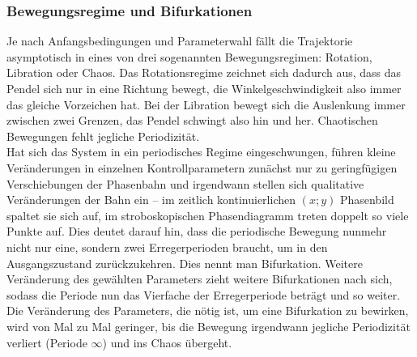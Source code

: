 \documentclass[numbers=noenddot,12pt,a4paper]{scrartcl}
\begin{document}
\subsubsection{Bewegungsregime und Bifurkationen}
Je nach Anfangsbedingungen und Parameterwahl fällt die Trajektorie asymptotisch in eines von drei sogenannten Bewegungsregimen: Rotation, Libration oder Chaos. Das Rotationsregime zeichnet sich dadurch aus, dass das Pendel sich nur in eine Richtung bewegt, die Winkelgeschwindigkeit also immer das gleiche Vorzeichen hat. Bei der Libration bewegt sich die Auslenkung immer zwischen zwei Grenzen, das Pendel schwingt also hin und her. Chaotischen Bewegungen fehlt jegliche Periodizität.\\
Hat sich das System in ein periodisches Regime eingeschwungen, führen kleine Veränderungen in einzelnen Kontrollparametern zunächst nur zu geringfügigen Verschiebungen der Phasenbahn und irgendwann stellen sich qualitative Veränderungen der Bahn ein -- im zeitlich kontinuierlichen $(x;y)$ Phasenbild spaltet sie sich auf, im stroboskopischen Phasendiagramm treten doppelt so viele Punkte auf. Dies deutet darauf hin, dass die periodische Bewegung nunmehr nicht nur eine, sondern zwei Erregerperioden braucht, um in den Ausgangszustand zurückzukehren. Dies nennt man Bifurkation. Weitere Veränderung des gewählten Parameters zieht weitere Bifurkationen nach sich, sodass die Periode nun das Vierfache der Erregerperiode beträgt und so weiter. Die Veränderung des Parameters, die nötig ist, um eine Bifurkation zu bewirken, wird von Mal zu Mal geringer, bis die Bewegung irgendwann jegliche Periodizität verliert (Periode $\infty$) und ins Chaos übergeht.
\end{document}
